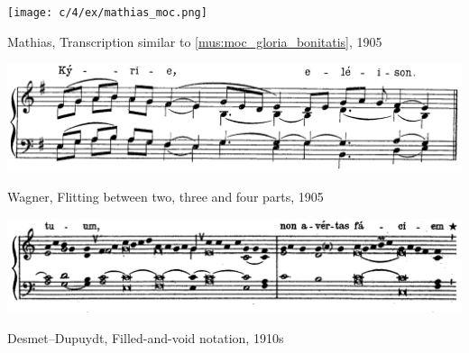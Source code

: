 \begin{landscape}

  \vspace*{\fill}

  \begin{example}
    \centering
    \texttt{[image: c/4/ex/mathias\_moc.png]}
    \caption{Mathias, Transcription similar to \cref{mus:moc_gloria_bonitatis}, 1905}
    \label{mus:mathias_moc_39}
  \end{example}

  \vspace*{\fill}

\end{landscape}

\begin{landscape}

  \vspace*{\fill}

  \begin{example}
    \centering
    \includegraphics[width=.7\linewidth]{c/4/ex/wagner_jubilo_42.png}
    \caption{Wagner, Flitting between two, three and four parts, 1905}
    \label{mus:wagner_jubilo_42}
  \end{example}

  \vspace*{\fill}




  \begin{example}
    \centering
    \includegraphics[width=.6\linewidth]{c/4/ex/desmetdupuydt_notation_97.png}
    \caption{Desmet--Dupuydt, Filled-and-void notation, 1910s}
    \label{mus:desmetdupuydt_notation_97}
  \end{example}

  \vspace*{\fill}

\end{landscape}

